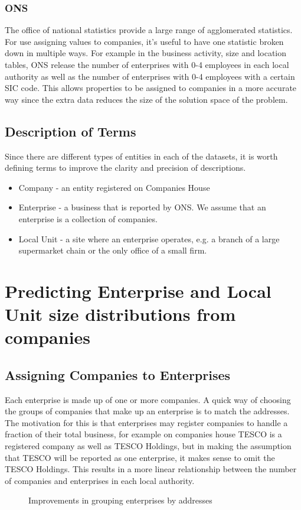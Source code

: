 \documentclass[a4paper,10pt]{article}
\begin{document}
\subsubsection{ONS}
The office of national statistics provide a large range of agglomerated statistics. For use assigning values to companies, it's useful to have one statistic broken down in multiple ways. For example in the business activity, size and location tables, ONS release the number of enterprises with 0-4 employees in each local authority as well as the number of enterprises with 0-4 employees with a certain SIC code. This allows properties to be assigned to companies in a more accurate way since the extra data reduces the size of the solution space of the problem.

\subsection{Description of Terms}
Since there are different types of entities in each of the datasets, it is worth defining terms to improve the clarity and precision of descriptions.
\begin{itemize}
 \item Company - an entity registered on Companies House
 \item Enterprise - a business that is reported by ONS. We assume that an enterprise is a collection of companies.
 \item Local Unit - a site where an enterprise operates, e.g. a branch of a large supermarket chain or the only office of a small firm.
\end{itemize}
\section{Predicting Enterprise and Local Unit size distributions from companies}
\subsection{Assigning Companies to Enterprises}
Each enterprise is made up of one or more companies. A quick way of choosing the groups of companies that make up an enterprise is to match the addresses. The motivation for this is that enterprises may register companies to handle a fraction of their total business, for example on companies house TESCO is a registered company as well as TESCO Holdings, but in making the assumption that TESCO will be reported as one enterprise, it makes sense to omit the TESCO Holdings. This results in a more linear relationship between the number of companies and enterprises in each local authority.
\begin{figure}[!ht]
 \caption{Improvements in grouping enterprises by addresses}
\end{figure}
\end{document}
